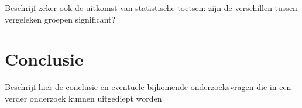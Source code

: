\documentclass[fleqn,10pt]{artikeltin}
\begin{document}
Beschrijf zeker ook de uitkomst van statistische toetsen: zijn de verschillen tussen vergeleken groepen significant?

\section{Conclusie}
\label{sec:conclusie}

Beschrijf hier de conclusie en eventuele bijkomende onderzoeksvragen die in een verder onderzoek kunnen uitgediept worden


\printbibliography[heading=bibintoc]
\end{document}
